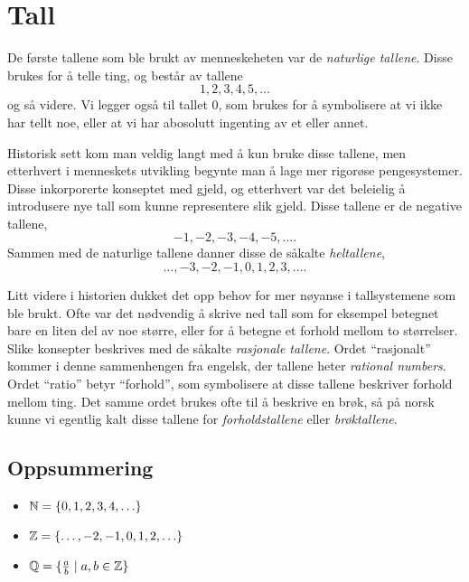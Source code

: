 

\section{Tall}

De første tallene som ble brukt av menneskeheten var de \emph{naturlige tallene}. 
Disse brukes for å telle ting, og består av tallene 
$$1, 2, 3, 4, 5, \ldots$$
og så videre.
Vi legger også til tallet $0$, som brukes for å symbolisere at vi ikke har tellt noe, eller at vi har abosolutt ingenting av et eller annet. 

Historisk sett kom man veldig langt med å kun bruke disse tallene, men etterhvert i menneskets utvikling begynte man å lage mer rigorøse pengesystemer. 
Disse inkorporerte konseptet med gjeld, og etterhvert var det beleielig å introdusere nye tall som kunne representere slik gjeld. 
Disse tallene er de negative tallene, 
$$-1, -2, -3, -4, -5, \ldots.$$
Sammen med de naturlige tallene danner disse de såkalte \emph{heltallene}, 
$$\ldots, -3, -2, -1, 0, 1, 2, 3, \ldots . $$

Litt videre i historien dukket det opp behov for mer nøyanse i tallsystemene som ble brukt. 
Ofte var det nødvendig å skrive ned tall som for eksempel betegnet bare en liten del av noe større, eller for å betegne et forhold mellom to størrelser. 
Slike konsepter beskrives med de såkalte \emph{rasjonale tallene}. 
Ordet ``rasjonalt'' kommer i denne sammenhengen fra engelsk, der tallene heter \emph{rational numbers}. 
Ordet ``ratio'' betyr ``forhold'', som symbolisere at disse tallene beskriver forhold mellom ting. 
Det samme ordet brukes ofte til å beskrive en brøk, så på norsk kunne vi egentlig kalt disse tallene for \emph{forholdstallene} eller \emph{brøktallene}.





\subsection{Oppsummering}
\begin{itemize}
    \item $\mathbb{N} = \{0,1,2,3,4,\ldots \}$
    \item $\mathbb{Z} = \{\ldots, -2, -1, 0, 1, 2, \ldots\}$ 
    \item $\mathbb{Q} = \{\frac{a}{b} \mid a, b \in \mathbb{Z}\}$
\end{itemize}